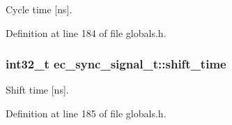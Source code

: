 \-Cycle time [ns]. 



\-Definition at line 184 of file globals.\-h.

\subsubsection[{shift\-\_\-time}]{\setlength{\rightskip}{0pt plus 5cm}int32\-\_\-t {\bf ec\-\_\-sync\-\_\-signal\-\_\-t\-::shift\-\_\-time}}\label{structec__sync__signal__t_a75c1a27b0421473e05bf737fd0d38368}


\-Shift time [ns]. 



\-Definition at line 185 of file globals.\-h.

